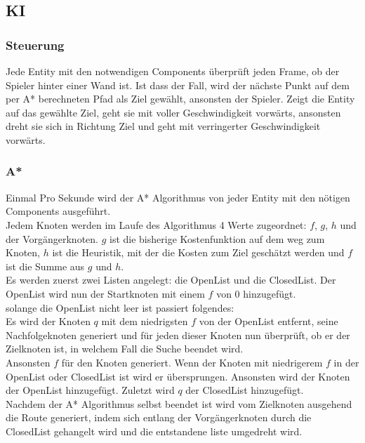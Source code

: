 \documentclass[a4paper,titlepage]{article}
\begin{document}
    \newpage
    
    \subsection{KI}
    
    \subsubsection*{Steuerung}
    
    Jede Entity mit den notwendigen Components überprüft jeden Frame, ob der Spieler hinter einer Wand ist. Ist dass der Fall, wird der nächste Punkt auf dem per A* berechneten Pfad als Ziel gewählt, ansonsten der Spieler. Zeigt die Entity auf das gewählte Ziel, geht sie mit voller Geschwindigkeit vorwärts, ansonsten dreht sie sich in Richtung Ziel und geht mit verringerter Geschwindigkeit vorwärts.
    
    \subsubsection*{A*}
    
    Einmal Pro Sekunde wird der A* Algorithmus von jeder Entity mit den nötigen Components ausgeführt. \\
    
    Jedem Knoten werden im Laufe des Algorithmus 4 Werte zugeordnet: $f$, $g$, $h$ und der Vorgängerknoten. $g$ ist die bisherige Kostenfunktion auf dem weg zum Knoten, $h$ ist die Heuristik, mit der die Kosten zum Ziel geschätzt werden und $f$ ist die Summe aus $g$ und $h$. \\
    Es werden zuerst zwei Listen angelegt: die OpenList und die ClosedList. Der OpenList wird nun der Startknoten mit einem $f$ von 0 hinzugefügt. \\
    solange die OpenList nicht leer ist passiert folgendes: \\
    Es wird der Knoten $q$ mit dem niedrigsten $f$ von der OpenList entfernt, seine Nachfolgeknoten generiert und für jeden dieser Knoten nun überprüft, ob er der Zielknoten ist, in welchem Fall die Suche beendet wird. \\
    Ansonsten $f$ für den Knoten generiert. Wenn der Knoten mit niedrigerem $f$ in der OpenList oder ClosedList ist wird er übersprungen. Ansonsten wird der Knoten der OpenList hinzugefügt. Zuletzt wird $q$ der ClosedList hinzugefügt. \\
    
    Nachdem der A* Algorithmus selbst beendet ist wird vom Zielknoten ausgehend die Route generiert, indem sich entlang der Vorgängerknoten durch die ClosedList gehangelt wird und die entstandene liste umgedreht wird.
    
\end{document}
